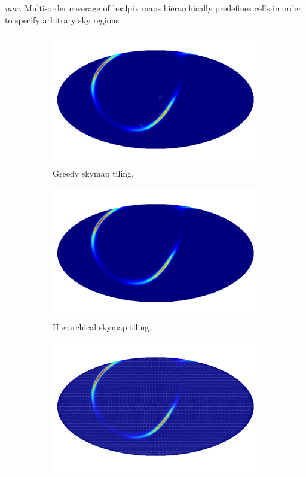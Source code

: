 \documentclass[twocolumn]{aastex61}
\begin{document}
\emph{moc}. Multi-order coverage of healpix maps hierarchically predefines cells in order to specify arbitrary sky regions \cite{FeBo2014}.
\begin{figure}[b]
    \centering
    \begin{subfigure}[b]{0.4\textwidth}
        \includegraphics[width=\textwidth]{tiling_greedy}
        \caption{Greedy skymap tiling.}
        \label{fig:tiling_greedy}
    \end{subfigure}
    \begin{subfigure}[b]{0.4\textwidth}
        \includegraphics[width=\textwidth]{tiling_hierarchical}
        \caption{Hierarchical skymap tiling.}
        \label{fig:tiling_hierarchical}
    \end{subfigure}
    \begin{subfigure}[b]{0.4\textwidth}
        \includegraphics[width=\textwidth]{tiling_moc}

\end{subfigure}
\end{figure}
\end{document}

